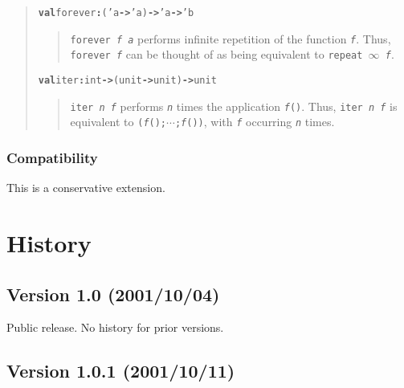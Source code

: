 \documentclass[twoside,titlepage]{article}
\begin{document}
\begin{appendix}
{\begin{quote}
\begin{alltt}
\textbf{val} forever \textbf{:} ('a \textbf{->} 'a) \textbf{->} 'a \textbf{->} 'b
\end{alltt}
  \begin{quote}
  {\tt forever \textsl{f a}} performs infinite repetition of the function {\tt\textsl{f}}. Thus, {\tt forever \textsl{f}} can be thought of as being equivalent to {\tt repeat $\infty$ \textsl{f}}.
  \end{quote}

\begin{alltt}
\textbf{val} iter \textbf{:} int \textbf{->} (unit \textbf{->} unit) \textbf{->} unit
\end{alltt}
  \begin{quote}
  {\tt iter \textsl{n f}} performs {\tt\textsl{n}} times the application {\tt\textsl{f}()}. Thus, {\tt iter \textsl{n f}} is equivalent to {\tt(\textsl{f}();$\cdots$;\textsl{f}())}, with {\tt\textsl{f}} occurring {\tt\textsl{n}} times.
  \end{quote}
\end{quote}

\subsubsection*{Compatibility}

This is a conservative extension.
}

\clearpage
\section{History}
\label{history}

\subsection*{Version 1.0 (2001/10/04)}

Public release. No history for prior versions.

\subsection*{Version 1.0.1 (2001/10/11)}


\end{appendix}
\end{document}
